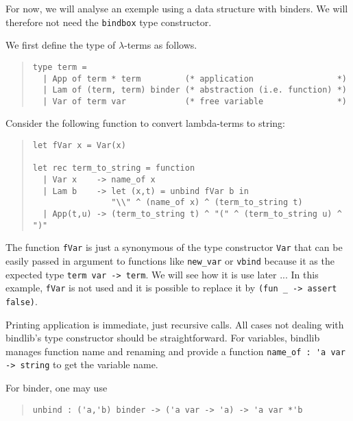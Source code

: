 \documentclass[11pt]{article}
\begin{document}
For now, we will analyse an exemple using a data structure with
binders. We will therefore not need the \verb#bindbox# type constructor.

We first define the type of $\lambda$-terms as follows.
\begin{quote}
\begin{verbatim}
type term =
  | App of term * term         (* application                 *)
  | Lam of (term, term) binder (* abstraction (i.e. function) *)
  | Var of term var            (* free variable               *)
\end{verbatim}
\end{quote}

Consider the following function to convert lambda-terms to string:

\begin{quote}
\begin{verbatim}
let fVar x = Var(x)

let rec term_to_string = function
  | Var x    -> name_of x
  | Lam b    -> let (x,t) = unbind fVar b in
                "\\" ^ (name_of x) ^ (term_to_string t)
  | App(t,u) -> (term_to_string t) ^ "(" ^ (term_to_string u) ^ ")"
\end{verbatim}
\end{quote}

The function \verb!fVar! is just a synonymous of the type constructor
\verb!Var! that can be easily passed in argument to functions like
\verb#new_var# or \verb#vbind# because it as the expected type
\verb#term var -> term#. We will see how it is use later ...
In this example, \verb!fVar! is not used and it is possible to
replace it by \verb!(fun _ -> assert false)!.

Printing application is immediate, just recursive calls. All cases not
dealing with bindlib's type constructor should be straightforward. For
variables, bindlib manages function name and renaming and provide a
function \verb!name_of : 'a var -> string! to get the variable name.

For binder, one may use
\begin{quote}
\begin{verbatim}
unbind : ('a,'b) binder -> ('a var -> 'a) -> 'a var *'b
\end{verbatim}
\end{quote}
\end{document}
